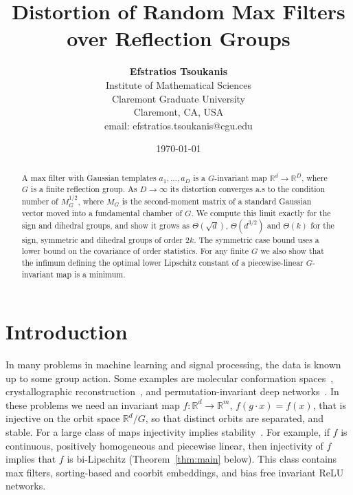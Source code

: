 \documentclass[11pt]{article}
\title{Distortion of Random Max Filters over Reflection Groups}
\author{{\bf Efstratios Tsoukanis} \\
	Institute of Mathematical Sciences \\ Claremont Graduate University \\
	Claremont, CA, USA \\ email: efstratios.tsoukanis@cgu.edu}
\date{\today}
\newcommand{\R}{\mathbb{R}}
\theoremstyle{definition}
\begin{document}
	\maketitle

\begin{abstract}
	A max filter with Gaussian templates $a_1,\dots,a_D$ is a 
	$G$-invariant map $\R^d\to\R^D$, where $G$ is a finite reflection group. As
	$D\to\infty$ its distortion converges a.s to the condition number of
	$M_G^{1/2}$, where $M_G$ is the second-moment matrix of a standard Gaussian
	vector moved into a fundamental chamber of $G$. We compute this limit exactly
	for the sign and dihedral groups, and show it grows as $\Theta(\sqrt d)$,
	$\Theta(d^{3/2})$ and $\Theta(k)$ for the sign, symmetric  and dihedral groups of order $2k$. The
	symmetric case bound uses a lower bound on the covariance of order
	statistics. For any finite $G$ we also show that the infimum defining the optimal lower Lipschitz
	constant of a piecewise-linear $G$-invariant map is a minimum.
\end{abstract}

	\section{Introduction}

	In many problems in machine learning and signal processing, the data is known
	 up to some group action. Some examples are molecular
	conformation spaces~\cite{dym2022low}, crystallographic
	reconstruction~\cite{edidin2023generic}, and permutation-invariant deep
	networks~\cite{deepsets,balan2025permutation}. In these problems we need an invariant map $f \colon \R^d \to \R^m$, $f(g \cdot x) = f(x)$, that is injective on the
	orbit space $\R^d/G$, so that distinct orbits are separated, and stable. For a large class of maps injectivity implies stability~\cite{freeman2024stability,sverdlov2024fsw}. For example, if $f$ is continuous, positively homogeneous and piecewise linear, then injectivity of $f$ implies that $f$ is bi-Lipschitz (Theorem~\ref{thm:main} below). This class contains max filters, sorting-based and
	coorbit embeddings, and bias free invariant ReLU networks.
	
\end{document}
